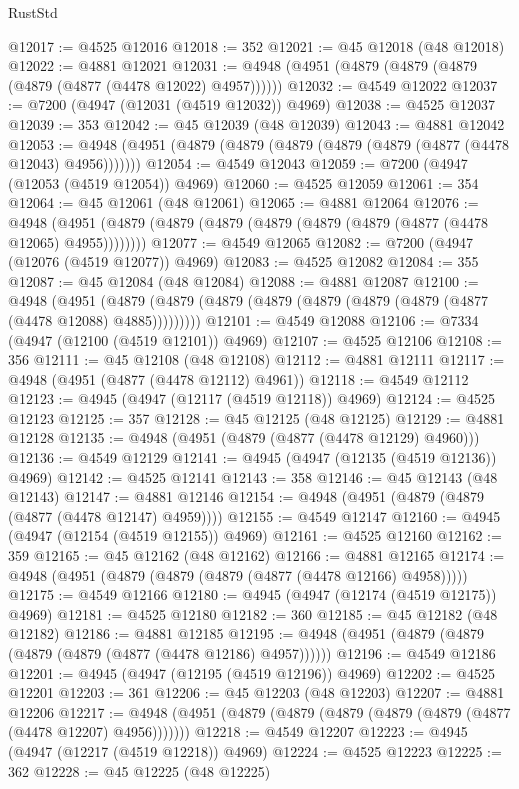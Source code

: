 \begin{lexlean}{RustStd}
\begin{coremodule}
{\begin{coremodule}
{{{{{{{{{{{{{{{{{{{{{{{{{{{{{{{{{{{{{{{{{{{{{{{{{{{{{{{{{{{{@12017 := @4525 @12016
@12018 := 352
@12021 := @45 @12018 (@48 @12018)
@12022 := @4881 @12021
@12031 := @4948 (@4951 (@4879 (@4879 (@4879 (@4879 (@4877 (@4478 @12022) @4957))))))
@12032 := @4549 @12022
@12037 := @7200 (@4947 (@12031 (@4519 @12032)) @4969)
@12038 := @4525 @12037
@12039 := 353
@12042 := @45 @12039 (@48 @12039)
@12043 := @4881 @12042
@12053 := @4948 (@4951 (@4879 (@4879 (@4879 (@4879 (@4879 (@4877 (@4478 @12043) @4956)))))))
@12054 := @4549 @12043
@12059 := @7200 (@4947 (@12053 (@4519 @12054)) @4969)
@12060 := @4525 @12059
@12061 := 354
@12064 := @45 @12061 (@48 @12061)
@12065 := @4881 @12064
@12076 := @4948 (@4951 (@4879 (@4879 (@4879 (@4879 (@4879 (@4879 (@4877 (@4478 @12065) @4955))))))))
@12077 := @4549 @12065
@12082 := @7200 (@4947 (@12076 (@4519 @12077)) @4969)
@12083 := @4525 @12082
@12084 := 355
@12087 := @45 @12084 (@48 @12084)
@12088 := @4881 @12087
@12100 := @4948
    (@4951 (@4879 (@4879 (@4879 (@4879 (@4879 (@4879 (@4879 (@4877 (@4478 @12088) @4885)))))))))
@12101 := @4549 @12088
@12106 := @7334 (@4947 (@12100 (@4519 @12101)) @4969)
@12107 := @4525 @12106
@12108 := 356
@12111 := @45 @12108 (@48 @12108)
@12112 := @4881 @12111
@12117 := @4948 (@4951 (@4877 (@4478 @12112) @4961))
@12118 := @4549 @12112
@12123 := @4945 (@4947 (@12117 (@4519 @12118)) @4969)
@12124 := @4525 @12123
@12125 := 357
@12128 := @45 @12125 (@48 @12125)
@12129 := @4881 @12128
@12135 := @4948 (@4951 (@4879 (@4877 (@4478 @12129) @4960)))
@12136 := @4549 @12129
@12141 := @4945 (@4947 (@12135 (@4519 @12136)) @4969)
@12142 := @4525 @12141
@12143 := 358
@12146 := @45 @12143 (@48 @12143)
@12147 := @4881 @12146
@12154 := @4948 (@4951 (@4879 (@4879 (@4877 (@4478 @12147) @4959))))
@12155 := @4549 @12147
@12160 := @4945 (@4947 (@12154 (@4519 @12155)) @4969)
@12161 := @4525 @12160
@12162 := 359
@12165 := @45 @12162 (@48 @12162)
@12166 := @4881 @12165
@12174 := @4948 (@4951 (@4879 (@4879 (@4879 (@4877 (@4478 @12166) @4958)))))
@12175 := @4549 @12166
@12180 := @4945 (@4947 (@12174 (@4519 @12175)) @4969)
@12181 := @4525 @12180
@12182 := 360
@12185 := @45 @12182 (@48 @12182)
@12186 := @4881 @12185
@12195 := @4948 (@4951 (@4879 (@4879 (@4879 (@4879 (@4877 (@4478 @12186) @4957))))))
@12196 := @4549 @12186
@12201 := @4945 (@4947 (@12195 (@4519 @12196)) @4969)
@12202 := @4525 @12201
@12203 := 361
@12206 := @45 @12203 (@48 @12203)
@12207 := @4881 @12206
@12217 := @4948 (@4951 (@4879 (@4879 (@4879 (@4879 (@4879 (@4877 (@4478 @12207) @4956)))))))
@12218 := @4549 @12207
@12223 := @4945 (@4947 (@12217 (@4519 @12218)) @4969)
@12224 := @4525 @12223
@12225 := 362
@12228 := @45 @12225 (@48 @12225)
}}}}}}}}}}}}}}}}}}}}}}}}}}}}}}}}}}}}}}}}}}}}}}}}}}}}}}}}}}}}
\end{coremodule}}
\end{coremodule}
\end{lexlean}
